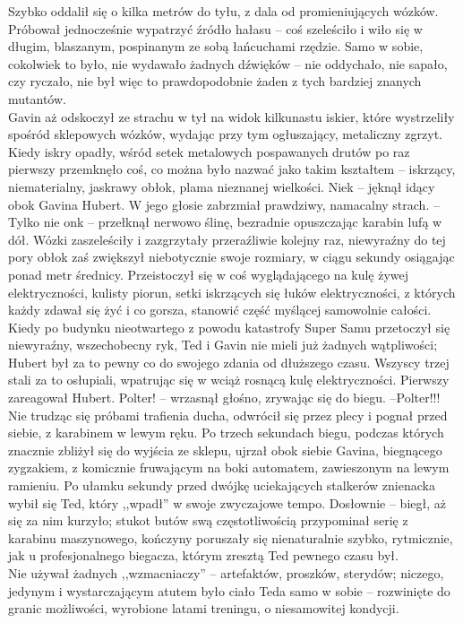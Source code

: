 \documentclass[../MAIN.tex]{subfiles}
\begin{document}
Szybko oddalił się o kilka metrów do tyłu, z dala od promieniujących wózków. Próbował jednocześnie wypatrzyć źródło hałasu -- coś szeleściło i wiło się w długim, blaszanym, pospinanym ze sobą łańcuchami rzędzie. Samo w sobie, cokolwiek to było, nie wydawało żadnych dźwięków -- nie oddychało, nie sapało, czy ryczało, nie był więc to prawdopodobnie żaden z tych bardziej znanych mutantów.\\
Gavin aż odskoczył ze strachu w tył na widok kilkunastu iskier, które wystrzeliły spośród sklepowych wózków, wydając przy tym ogłuszający, metaliczny zgrzyt. Kiedy iskry opadły, wśród setek metalowych pospawanych drutów po raz pierwszy przemknęło coś, co można było nazwać jako takim kształtem -- iskrzący, niematerialny, jaskrawy obłok, plama nieznanej wielkości.
\sx Nie\3k -- jęknął idący obok Gavina Hubert. W jego głosie zabrzmiał prawdziwy, namacalny strach. -- Tylko nie on\3k -- przełknął nerwowo ślinę, bezradnie opuszczając karabin lufą w dół.
\qd
Wózki zaszeleściły i zazgrzytały przeraźliwie kolejny raz, niewyraźny do tej pory obłok zaś zwiększył niebotycznie swoje rozmiary, w ciągu sekundy osiągając ponad metr średnicy. Przeistoczył się w coś wyglądającego na kulę żywej elektryczności, kulisty piorun, setki iskrzących się łuków elektryczności, z których każdy zdawał się żyć i co gorsza, stanowić część myślącej samowolnie całości.\\
Kiedy po budynku nieotwartego z powodu katastrofy Super Samu przetoczył się niewyraźny, wszechobecny ryk, Ted i Gavin nie mieli już żadnych wątpliwości; Hubert był za to pewny co do swojego zdania od dłuższego czasu. Wszyscy trzej stali za to osłupiali, wpatrując się w wciąż rosnącą kulę elektryczności. Pierwszy zareagował Hubert.
\sx Polter! -- wrzasnął głośno, zrywając się do biegu. –Polter!!!
\qd
Nie trudząc się próbami trafienia ducha, odwrócił się przez plecy i pognał przed siebie, z karabinem w lewym ręku. Po trzech sekundach biegu, podczas których znacznie zbliżył się do wyjścia ze sklepu, ujrzał obok siebie Gavina, biegnącego zygzakiem, z komicznie fruwającym na boki automatem, zawieszonym na lewym ramieniu. Po ułamku sekundy przed dwójkę uciekających stalkerów znienacka wybił się Ted, który ,,wpadł'' w swoje zwyczajowe tempo. Dosłownie -- biegł, aż się za nim kurzyło; stukot butów swą częstotliwością przypominał serię z karabinu maszynowego, kończyny poruszały się nienaturalnie szybko, rytmicznie, jak u profesjonalnego biegacza, którym zresztą Ted pewnego czasu był.\\
Nie używał żadnych ,,wzmacniaczy'' -- artefaktów, proszków, sterydów; niczego, jedynym i wystarczającym atutem było ciało Teda samo w sobie -- rozwinięte do granic możliwości, wyrobione latami treningu, o niesamowitej kondycji.\\
\end{document}

